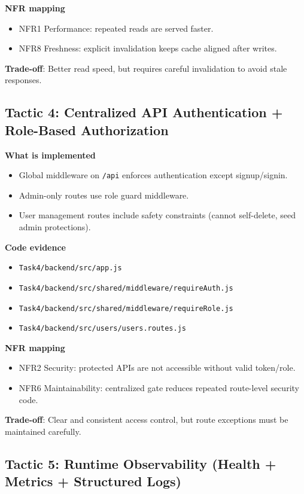 \documentclass[12pt,journal,onecolumn]{IEEEtran}
\begin{document}
\textbf{NFR mapping}
\begin{itemize}
    \item NFR1 Performance: repeated reads are served faster.
    \item NFR8 Freshness: explicit invalidation keeps cache aligned after writes.
\end{itemize}

\textbf{Trade-off}: Better read speed, but requires careful invalidation to avoid stale responses.

\subsection{Tactic 4: Centralized API Authentication + Role-Based Authorization}

\textbf{What is implemented}
\begin{itemize}
    \item Global middleware on \texttt{/api} enforces authentication except signup/signin.
    \item Admin-only routes use role guard middleware.
    \item User management routes include safety constraints (cannot self-delete, seed admin protections).
\end{itemize}

\textbf{Code evidence}
\begin{itemize}
    \item \texttt{Task4/backend/src/app.js}
    \item \texttt{Task4/backend/src/shared/middleware/requireAuth.js}
    \item \texttt{Task4/backend/src/shared/middleware/requireRole.js}
    \item \texttt{Task4/backend/src/users/users.routes.js}
\end{itemize}

\textbf{NFR mapping}
\begin{itemize}
    \item NFR2 Security: protected APIs are not accessible without valid token/role.
    \item NFR6 Maintainability: centralized gate reduces repeated route-level security code.
\end{itemize}

\textbf{Trade-off}: Clear and consistent access control, but route exceptions must be maintained carefully.

\subsection{Tactic 5: Runtime Observability (Health + Metrics + Structured Logs)}
\end{document}

